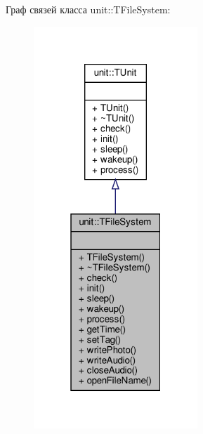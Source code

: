 Граф связей класса unit\+:\+:T\+File\+System\+:\nopagebreak
\begin{figure}[H]
\begin{center}
\leavevmode
\includegraphics[width=175pt]{classunit_1_1_t_file_system__coll__graph}
\end{center}
\end{figure}
